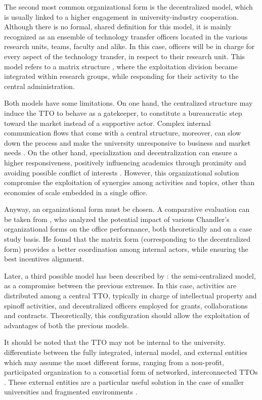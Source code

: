 The second most common organizational form is the decentralized model, which is usually linked to a higher engagement in university-industry cooperation. Although there is no formal, shared definition for this model, it is mainly recognized as an ensemble of technology transfer officers located in the various research units, teams, faculty and alike. In this case, officers will be in charge for every aspect of the technology transfer, in respect to their research unit. This model refers to a matrix structure \citep{Debackere2005}, where the exploitation division became integrated within research groups, while responding for their activity to the central administration.

Both models have some limitations. On one hand, the centralized structure may induce the TTO to behave as a gatekeeper, to constitute a bureaucratic step toward the market instead of a supportive actor. Complex internal communication flows that come with a central structure, moreover, can slow down the process and make the university unresponsive to business and market needs \citep{Litan2008}. On the other hand, specialization and decentralization can ensure a higher responsiveness, positively influencing academics through proximity and avoiding possible conflict of interests \citep{Debackere2005}. However, this organizational solution compromise the exploitation of synergies among activities and topics, other than economies of scale embedded in a single office.

Anyway, an organizational form must be chosen. A comparative evaluation can be taken from \citet{Bercovitz2001}, who analyzed the potential impact of various Chandler's organizational forms on the office performance, both theoretically and on a case study basis. He found that the matrix form (corresponding to the decentralized form) provides a better coordination among internal actors, while ensuring the best incentives alignment. 

Later, a third possible model has been described by \citet{Brescia2016}: the semi-centralized model, as a compromise between the previous extremes. In this case, activities are distributed among a central TTO, typically in charge of intellectual property and spinoff activities, and decentralized officers employed for grants, collaborations and contracts. Theoretically, this configuration should allow the exploitation of advantages of both the previous models. 

It should be noted that the TTO may not be internal to the university. \citet{Fisher2002} differentiate between the fully integrated, internal model, and external entities which may assume the most different forms, ranging from a non-profit, participated organization to a consortial form of networked, interconnected TTOs \citep{Brescia2016}. These external entities are a particular useful solution in the case of smaller universities and fragmented environments \citep{Debackere2005}.

